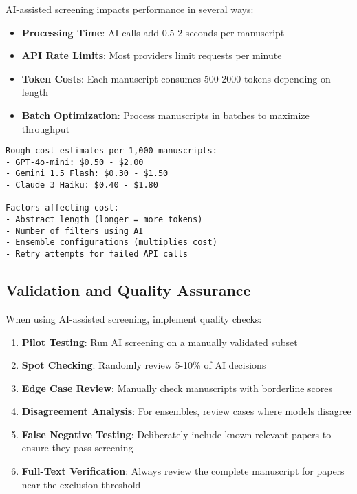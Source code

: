 AI-assisted screening impacts performance in several ways:

\begin{itemize}
    \item \textbf{Processing Time}: AI calls add 0.5-2 seconds per manuscript
    \item \textbf{API Rate Limits}: Most providers limit requests per minute
    \item \textbf{Token Costs}: Each manuscript consumes 500-2000 tokens depending on length
    \item \textbf{Batch Optimization}: Process manuscripts in batches to maximize throughput
\end{itemize}

\begin{infobox}
\begin{lstlisting}
Rough cost estimates per 1,000 manuscripts:
- GPT-4o-mini: $0.50 - $2.00
- Gemini 1.5 Flash: $0.30 - $1.50
- Claude 3 Haiku: $0.40 - $1.80

Factors affecting cost:
- Abstract length (longer = more tokens)
- Number of filters using AI
- Ensemble configurations (multiplies cost)
- Retry attempts for failed API calls
\end{lstlisting}
\end{infobox}

\subsection{Validation and Quality Assurance}


When using AI-assisted screening, implement quality checks:

\begin{enumerate}
    \item \textbf{Pilot Testing}: Run AI screening on a manually validated subset
    \item \textbf{Spot Checking}: Randomly review 5-10\% of AI decisions
    \item \textbf{Edge Case Review}: Manually check manuscripts with borderline scores
    \item \textbf{Disagreement Analysis}: For ensembles, review cases where models disagree
    \item \textbf{False Negative Testing}: Deliberately include known relevant papers to ensure they pass screening
    \item \textbf{Full-Text Verification}: Always review the complete manuscript for papers near the exclusion threshold
\end{enumerate}

